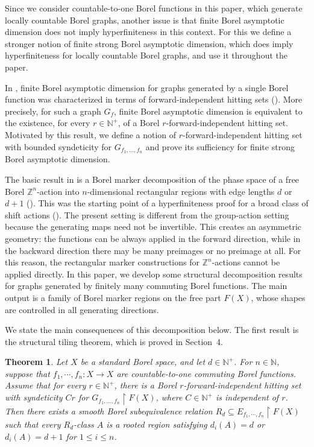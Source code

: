 \documentclass[11pt, reqno, a4paper]{amsart}
\newtheorem{theorem}{Theorem}[section]
\theoremstyle{definition}
\theoremstyle{plain}
\begin{document}
Since we consider countable-to-one Borel functions in this paper, which generate locally countable Borel graphs, another issue is that finite Borel asymptotic dimension does not imply hyperfiniteness in this context. For this we define a stronger notion of finite strong Borel asymptotic dimension, which does imply hyperfiniteness for locally countable Borel graphs, and use it throughout the paper.

In \cite{GrebikHiggins2026}, finite Borel asymptotic dimension for graphs generated by
a single Borel function was characterized in terms of forward-independent
hitting sets (\cite[Theorem 1.2]{GrebikHiggins2026}). More precisely, for such a graph $G_f$, finite Borel asymptotic
dimension is equivalent to the existence, for every $r\in\mathbb N^+$, of a
Borel $r$-forward-independent hitting set. 
Motivated by this result, we define a notion of $r$-forward-independent hitting set with bounded syndeticity for $G_{f_1,\dots, f_n}$ and prove its sufficiency for finite strong
Borel asymptotic dimension. 

The basic result in \cite{GaoJackson2015} is a Borel marker decomposition of the phase space of a free Borel $\mathbb Z^n$-action into $n$-dimensional rectangular regions with edge lengths $d$ or $d+1$ (\cite[Theorem~3.1]{GaoJackson2015}). This was the starting point of a hyperfiniteness proof for a broad class of shift actions (\cite[Theorem~8.1]{GaoJackson2015}).
The present setting is different from the group-action setting because the
generating maps need not be invertible. This creates an asymmetric geometry:
the functions can be always applied in the forward direction, while in the backward direction there may be many
preimages or no preimage at all. For this reason, the rectangular marker
constructions for $\mathbb Z^n$-actions cannot be applied directly. In this paper, we develop some structural decomposition results for 
graphs generated by finitely many commuting Borel functions. The main output is
a family of Borel marker regions on the free part $F(X)$, whose shapes are
controlled in all generating directions.


We state the main consequences of this decomposition below. The first result is
the structural tiling theorem, which is proved in Section~4.
\begin{theorem}
Let $X$ be a standard Borel space, and let $d\in \mathbb{N}^+$. For $n\in \mathbb{N}$, suppose that $f_1,\cdots ,f_n:X\to X$ are countable-to-one commuting Borel functions. Assume that for every $r\in\mathbb N^+$, there is a Borel $r$-forward-independent
hitting set with syndeticity $Cr$ for
$G_{f_1,\ldots,f_n}\upharpoonright F(X)$,
where $C\in\mathbb N^+$ is independent of $r$. Then there exists a smooth Borel subequivalence relation
$R_d\subseteq E_{f_1,\cdots,f_n}\upharpoonright F(X)$
such that every $R_d$-class $A$ is a rooted region satisfying
 $d_i(A)=d$ or $d_i(A)=d+1$ for $1\le i \le n$. 
\end{theorem}
\end{document}
